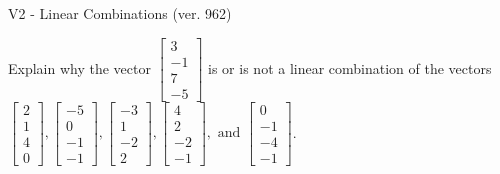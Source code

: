 \begin{exercise}
  \begin{exerciseTitle}V2 - Linear Combinations (ver. 962)\end{exerciseTitle}
  \begin{exerciseStatement}
    Explain why the vector \(\left[\begin{array}{c}
3 \\
-1 \\
7 \\
-5
\end{array}\right]\)  is or is not a linear 
	combination of the vectors \(\left[\begin{array}{c}
2 \\
1 \\
4 \\
0
\end{array}\right] , \left[\begin{array}{c}
-5 \\
0 \\
-1 \\
-1
\end{array}\right] , \left[\begin{array}{c}
-3 \\
1 \\
-2 \\
2
\end{array}\right] , \left[\begin{array}{c}
4 \\
2 \\
-2 \\
-1
\end{array}\right] , \text{ and } \left[\begin{array}{c}
0 \\
-1 \\
-4 \\
-1
\end{array}\right]\).
	



\end{exerciseStatement}
\end{exercise}
